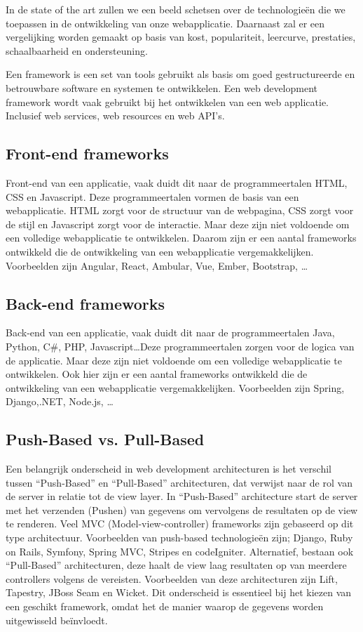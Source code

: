 In de state of the art zullen we een beeld schetsen over de technologieën die
we toepassen in de ontwikkeling van onze webapplicatie. Daarnaast zal er een
vergelijking worden gemaakt op basis van kost, populariteit, leercurve,
prestaties, schaalbaarheid en ondersteuning.

Een framework is een set van tools gebruikt als basis om goed gestructureerde
en betrouwbare software en systemen te ontwikkelen. Een web development
framework wordt vaak gebruikt bij het ontwikkelen van een web applicatie.
Inclusief web services, web resources en web API's.

\subsection{Front-end frameworks}%
Front-end van een applicatie, vaak duidt dit naar de programmeertalen HTML, CSS
en Ja\-va\-script. Deze programmeertalen vormen de basis van een webapplicatie.
HTML zorgt voor de structuur van de webpagina, CSS zorgt voor de stijl en
Ja\-va\-script zorgt voor de interactie. Maar deze zijn niet voldoende om een
volledige webapplicatie te ontwikkelen. Daarom zijn er een aantal frameworks
ontwikkeld die de ontwikkeling van een webapplicatie vergemakkelijken.
Voorbeelden zijn Angular, React, Ambular, Vue, Ember, Bootstrap,
\ldots\autocite{Jaiswal2022}

\subsection{Back-end frameworks}%
Back-end van een applicatie, vaak duidt dit naar de programmeertalen Java,
Python, C\#, PHP, Ja\-va\-script\ldots Deze programmeertalen zorgen voor de
logica van de applicatie. Maar deze zijn niet voldoende om een volledige
webapplicatie te ontwikkelen. Ook hier zijn er een aantal frameworks ontwikkeld
die de ontwikkeling van een webapplicatie vergemakkelijken. Voorbeelden zijn
Spring, Django,.NET, Node.js, \ldots\autocite{Kaluza2019}

\subsection{Push-Based vs. Pull-Based}%
Een belangrijk onderscheid in web development architecturen is het verschil
tussen ``Push-Based'' en ``Pull-Based'' architecturen, dat verwijst naar de rol
van de server in relatie tot de view layer.\autocite{Lomas2022} 
\bigbreak
In ``Push-Based'' architecture start de server met het verzenden (Pushen) van
gegevens om vervolgens de resultaten op de view te renderen. Veel MVC
(Model-view-controller) frameworks zijn gebaseerd op dit type architectuur.
Voorbeelden van push-based technologieën zijn; Django, Ruby on Rails, Symfony,
Spring MVC, Stripes en codeIgniter. \bigbreak Alternatief, bestaan ook
``Pull-Based'' architecturen, deze haalt de view laag resultaten op van
meerdere controllers volgens de vereisten. Voorbeelden van deze architecturen
zijn Lift, Tapestry, JBoss Seam en Wicket.
\bigbreak
Dit onderscheid is
essentieel bij het kiezen van een geschikt framework, omdat het de manier
waarop de gegevens worden uitgewisseld beïnvloedt.

